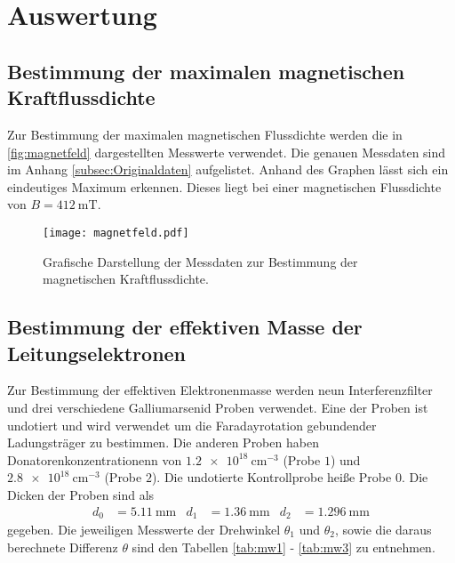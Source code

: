 \section{Auswertung}
\label{sec:Auswertung}

\subsection{Bestimmung der maximalen magnetischen Kraftflussdichte}
Zur Bestimmung der maximalen magnetischen Flussdichte werden die in \autoref{fig:magnetfeld} dargestellten Messwerte verwendet. Die genauen Messdaten sind im Anhang
\ref{subsec:Originaldaten} aufgelistet. Anhand des Graphen lässt sich ein eindeutiges Maximum erkennen. Dieses liegt bei einer magnetischen Flussdichte von 
$B = \qty{412}{\milli\tesla}$.

\begin{figure}
  \centering
  \texttt{[image: magnetfeld.pdf]}
  \caption{Grafische Darstellung der Messdaten zur Bestimmung der magnetischen Kraftflussdichte.}
  \label{fig:magnetfeld}
\end{figure}

\subsection{Bestimmung der effektiven Masse der Leitungselektronen}
\label{subsec:Elektronenmasse}
Zur Bestimmung der effektiven Elektronenmasse werden neun Interferenzfilter und drei verschiedene Galliumarsenid Proben verwendet. Eine der Proben ist undotiert und wird verwendet 
um die Faradayrotation gebundender Ladungsträger zu bestimmen. Die anderen Proben haben Donatorenkonzentrationenn von $\qty{1.2e18}{\centi\metre^{-3}}$ (Probe $1$) und 
$\qty{2.8e18}{\centi\metre^{-3}}$ (Probe $2$). Die undotierte Kontrollprobe heiße Probe $0$.
Die Dicken der Proben sind als
\begin{align*}
  d_0 &= \qty{5.11}{\milli\metre} & d_1 &= \qty{1.36}{\milli\metre} & d_2 &= \qty{1.296}{\milli\metre}
\end{align*}
gegeben. Die jeweiligen Messwerte der Drehwinkel $\theta_1$ und $\theta_2$, sowie die daraus berechnete Differenz $\theta$ sind den Tabellen 
\ref{tab:mw1} - \ref{tab:mw3} zu entnehmen.

